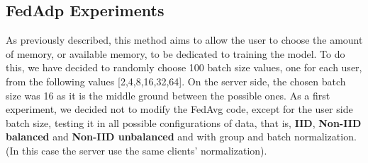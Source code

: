 \documentclass[conference]{IEEEtran}
\begin{document}
\subsection{FedAdp Experiments}
As previously described, this method aims to allow the user to choose the amount of memory, or available memory, to be dedicated to training the model. To do this, we have decided to randomly choose 100 batch size values, one for each user, from the following values [2,4,8,16,32,64]. On the server side, the chosen batch size was 16 as it is the middle ground between the possible ones. As a first experiment, we decided not to modify the FedAvg code, except for the user side batch size, testing it in all possible configurations of data, that is,\textbf{ IID}, \textbf{Non-IID balanced} and \textbf{Non-IID unbalanced} and with group and batch normalization. (In this case the server use the same clients' normalization).
\end{document}
